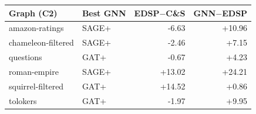 \begin{tabular}{llrr}
\toprule
Graph (C2) & Best GNN & EDSP$-$C\&S & GNN$-$EDSP \\
\midrule
amazon-ratings & SAGE+ & -6.63 & +10.96 \\
chameleon-filtered & SAGE+ & -2.46 & +7.15 \\
questions & GAT+ & -0.67 & +4.23 \\
roman-empire & SAGE+ & +13.02 & +24.21 \\
squirrel-filtered & GAT+ & +14.52 & +0.86 \\
tolokers & GAT+ & -1.97 & +9.95 \\
\bottomrule
\end{tabular}
